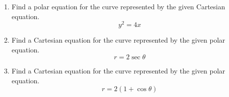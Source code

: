 \begin{enumerate}[{Example} 1:]

\vfill

\pagebreak

\item 
Find a polar equation for the curve represented by the given Cartesian equation.
\[
y^2 = 4x
\]

\vfill

\item 
Find a Cartesian equation for the curve represented by the given polar equation.
\[
r = 2 \sec\theta
\]

\vfill

\item 
Find a Cartesian equation for the curve represented by the given polar equation.
\[
r = 2(1+ \cos\theta)
\]

\vfill

\end{enumerate}


